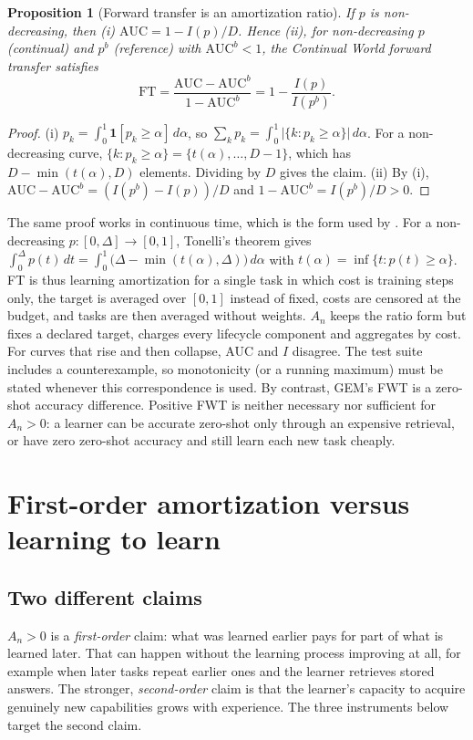 \documentclass[11pt]{article}
\newtheorem{proposition}{Proposition}
\theoremstyle{remark}
\newcommand{\ind}{\mathbf{1}}
\begin{document}
\begin{proposition}[Forward transfer is an amortization ratio]\label{prop:ft}
If $p$ is non-decreasing, then (i) $\mathrm{AUC} = 1 - I(p)/D$. Hence (ii), for non-decreasing $p$ (continual) and $p^b$ (reference) with $\mathrm{AUC}^b<1$, the Continual World forward transfer \citep{wolczyk2021continual} satisfies
\[
\mathrm{FT} = \frac{\mathrm{AUC}-\mathrm{AUC}^b}{1-\mathrm{AUC}^b} = 1-\frac{I(p)}{I(p^b)} .
\]
\end{proposition}
\begin{proof}
(i) $p_k = \int_0^1 \ind[p_k\ge\alpha]\,d\alpha$, so $\sum_k p_k = \int_0^1 \bigl|\{k: p_k\ge\alpha\}\bigr|\,d\alpha$. For a non-decreasing curve, $\{k:p_k\ge\alpha\}=\{t(\alpha),\dots,D-1\}$, which has $D-\min(t(\alpha),D)$ elements. Dividing by $D$ gives the claim.
(ii) By (i), $\mathrm{AUC}-\mathrm{AUC}^b = (I(p^b)-I(p))/D$ and $1-\mathrm{AUC}^b = I(p^b)/D>0$.
\end{proof}
The same proof works in continuous time, which is the form used by \citet{wolczyk2021continual}. For a non-decreasing $p:[0,\Delta]\to[0,1]$, Tonelli's theorem gives $\int_0^\Delta p(t)\,dt=\int_0^1 \bigl(\Delta-\min(t(\alpha),\Delta)\bigr)\,d\alpha$ with $t(\alpha)=\inf\{t:p(t)\ge\alpha\}$.
FT is thus learning amortization for a single task in which cost is training steps only, the target is averaged over $[0,1]$ instead of fixed, costs are censored at the budget, and tasks are then averaged without weights.
$A_n$ keeps the ratio form but fixes a declared target, charges every lifecycle component and aggregates by cost.
For curves that rise and then collapse, AUC and $I$ disagree.
The test suite includes a counterexample, so monotonicity (or a running maximum) must be stated whenever this correspondence is used.
By contrast, GEM's FWT \citep{lopezpaz2017gem} is a zero-shot accuracy difference.
Positive FWT is neither necessary nor sufficient for $A_n>0$: a learner can be accurate zero-shot only through an expensive retrieval, or have zero zero-shot accuracy and still learn each new task cheaply.

\section{First-order amortization versus learning to learn}\label{sec:l2l}

\subsection{Two different claims}
$A_n>0$ is a \emph{first-order} claim: what was learned earlier pays for part of what is learned later.
That can happen without the learning process improving at all, for example when later tasks repeat earlier ones and the learner retrieves stored answers.
The stronger, \emph{second-order} claim is that the learner's capacity to acquire genuinely new capabilities grows with experience.
The three instruments below target the second claim.
\end{document}
